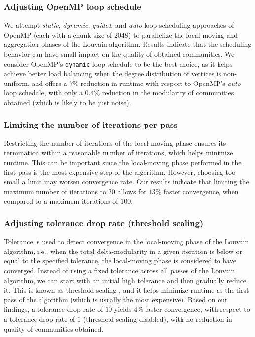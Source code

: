 




\subsubsection{Adjusting OpenMP loop schedule}

We attempt \textit{static}, \textit{dynamic}, \textit{guided}, and \textit{auto} loop scheduling approaches of OpenMP (each with a chunk size of $2048$) to parallelize the local-moving and aggregation phases of the Louvain algorithm. Results indicate that the scheduling behavior can have small impact on the quality of obtained communities. We consider OpenMP's \verb|dynamic| loop schedule to be the best choice, as it helps achieve better load balancing when the degree distribution of vertices is non-uniform, and offers a $7\%$ reduction in runtime with respect to OpenMP's \textit{auto} loop schedule, with only a $0.4\%$ reduction in the modularity of communities obtained (which is likely to be just noise).

\subsubsection{Limiting the number of iterations per pass}

Restricting the number of iterations of the local-moving phase ensures its termination within a reasonable number of iterations, which helps minimize runtime. This can be important since the local-moving phase performed in the first pass is the most expensive step of the algorithm. However, choosing too small a limit may worsen convergence rate. Our results indicate that limiting the maximum number of iterations to $20$ allows for $13\%$ faster convergence, when compared to a maximum iterations of $100$.


\subsubsection{Adjusting tolerance drop rate (threshold scaling)}

Tolerance is used to detect convergence in the local-moving phase of the Louvain algorithm, i.e., when the total delta-modularity in a given iteration is below or equal to the specified tolerance, the local-moving phase is considered to have converged. Instead of using a fixed tolerance across all passes of the Louvain algorithm, we can start with an initial high tolerance and then gradually reduce it. This is known as threshold scaling \cite{com-lu15, com-naim17, com-halappanavar17}, and it helps minimize runtime as the first pass of the algorithm (which is usually the most expensive). Based on our findings, a tolerance drop rate of $10$ yields $4\%$ faster convergence, with respect to a tolerance drop rate of $1$ (threshold scaling disabled), with no reduction in quality of communities obtained.


